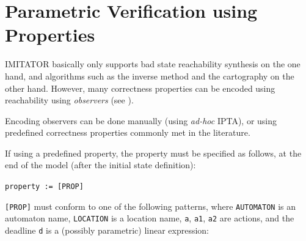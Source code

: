 \documentclass[a4paper,11pt]{report}
\newcommand{\imitator}{\textsf{IMITATOR}}
\newcommand{\IPTA}{IPTA}
\newcommand{\styleIMI}[1]{\textcolor{imicolor}{\texttt{#1}}}
\newcommand{\adhoc}{\textcolor{colorok}{\textit{ad-hoc} }} %
\begin{document}
\section{Parametric Verification using Properties}\label{ss:mode:prop}

\imitator{} basically only supports bad state reachability synthesis on the one hand, and algorithms such as the inverse method and the cartography on the other hand.
However, many correctness properties can be encoded using reachability using \emph{observers} (see \cite{ABL98,ABBL98,Andre13ICECCS}).

Encoding observers can be done manually (using \adhoc{} \IPTA{}), or using predefined correctness properties commonly met in the literature.

If using a predefined property, the property must be specified as follows, at the end of the model (after the initial state definition):

\styleIMI{property := [PROP]}

\styleIMI{[PROP]} must conform to one of the following patterns, where \styleIMI{AUTOMATON} is an automaton name, \styleIMI{LOCATION} is a location name, \styleIMI{a}, \styleIMI{a1}, \styleIMI{a2} are actions, and the deadline \styleIMI{d} is a (possibly parametric) linear expression:
\end{document}
